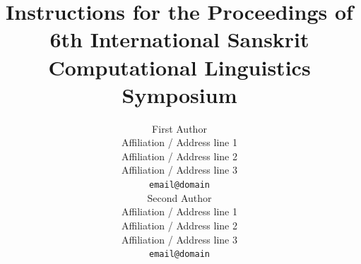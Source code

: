 \documentclass{article}
\begin{document}
\usepackage{fontspec, xunicode, xltxtra}
\setmainfont[Path = ./,
 Extension = .ttf,
 UprightFont = *-Regular]
{Sanskrit2003}





\title{Instructions for the Proceedings of \\6th International Sanskrit Computational Linguistics Symposium}

\author{First Author \\
  Affiliation / Address line 1 \\
  Affiliation / Address line 2 \\
  Affiliation / Address line 3 \\
  {\tt email@domain} \\\And
  Second Author \\
  Affiliation / Address line 1 \\
  Affiliation / Address line 2 \\
  Affiliation / Address line 3 \\
  {\tt email@domain} \\}

\date{}
\end{document}
